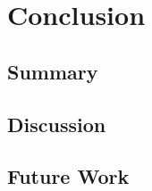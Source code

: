 \chapter{Conclusion}
\label{ch:conclusion}
\glsresetall

\section{Summary}

\lipsum[1-2]

\section{Discussion}

\lipsum[3-4]


\section{Future Work}

\lipsum[5]

\bigskip

\lipsum[6]
